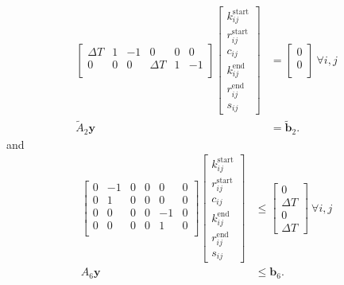 \begin{equation} \begin{aligned}
	\begin{bmatrix}\Delta T &  1 & -1 & 0        & 0 &  0\\ 
		       0        &  0 & 0  & \Delta T & 1 & -1\\
	\end{bmatrix} 
	\begin{bmatrix} k_{ij}^{\text{start}} \\
		        r_{ij}^{\text{start}} \\
			c_{ij}                \\
			k_{ij}^{\text{end}}   \\
			r_{ij}^{\text{end}}   \\
			s_{ij}
	\end{bmatrix} &= 
	\begin{bmatrix} 0 \\
	                0 \\
	\end{bmatrix} \ \forall i,j \\ 
	\tilde{A}_2\mathbf{y} &= \tilde{\mathbf{b}}_2.
\end{aligned} \end{equation}
and 
\begin{equation} \begin{aligned}
	\begin{bmatrix} 0 & -1 & 0 & 0 &  0 & 0\\
			0 &  1 & 0 & 0 &  0 & 0\\
		        0 &  0 & 0 & 0 & -1 & 0\\
			0 &  0 & 0 & 0 &  1 & 0\\
	\end{bmatrix} 
	\begin{bmatrix} k_{ij}^{\text{start}} \\
		        r_{ij}^{\text{start}} \\
			c_{ij}                \\
			k_{ij}^{\text{end}}   \\
			r_{ij}^{\text{end}}   \\
			s_{ij}
	\end{bmatrix} &\le 
	\begin{bmatrix}  0\\
			\Delta T \\
			0 \\
			\Delta T
	\end{bmatrix} \ \forall i,j \\ 
	A_6\mathbf{y} &\le \mathbf{b}_6.  
\end{aligned} \end{equation}
